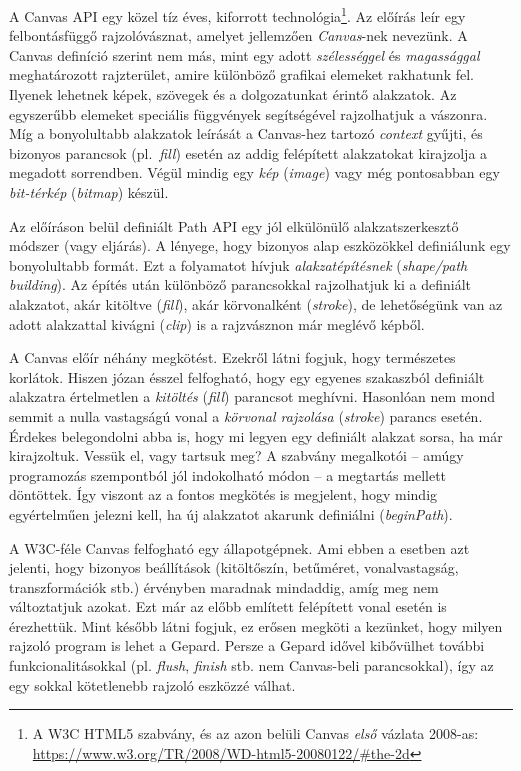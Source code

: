 \documentclass[12pt]{report}
\theoremstyle{definition}
\newcommand{\inenglish}[1]{\textsl{#1}}
\newcommand{\func}[1]{{\textsl{#1}}}
\begin{document}
A Canvas API egy közel tíz éves, kiforrott technológia\footnote {A W3C HTML5
szabvány, és az azon belüli Canvas \emph{első} vázlata 2008-as:\\
{\footnotesize\url{https://www.w3.org/TR/2008/WD-html5-20080122/\#the-2d}}}. Az
előírás leír egy felbontásfüggő rajzolóvásznat, amelyet jellemzően
\emph{Canvas}-nek nevezünk. A Canvas definíció szerint nem más, mint egy adott
\emph{szélességgel} és \emph{magassággal} meghatározott rajzterület, amire
különböző grafikai elemeket rakhatunk fel. Ilyenek lehetnek képek, szövegek és
a dolgozatunkat érintő alakzatok. Az egyszerűbb elemeket speciális függvények
segítségével rajzolhatjuk a vászonra. Míg a bonyolultabb alakzatok leírását a
Canvas-hez tartozó \emph{context} gyűjti, és bizonyos parancsok
(pl.~\emph{fill}) esetén az addig felépített alakzatokat kirajzolja a megadott
sorrendben. Végül mindig egy \emph{kép} (\inenglish{image}) vagy még
pontosabban egy \emph{bit-térkép} (\inenglish{bitmap}) készül.

Az előíráson belül definiált Path API egy jól elkülönülő alakzatszerkesztő
módszer (vagy eljárás). A lényege, hogy bizonyos alap eszközökkel definiálunk egy
bonyolultabb formát. Ezt a folyamatot hívjuk \emph{alakzatépítésnek}
(\inenglish{shape/path building}). Az építés után különböző parancsokkal
rajzolhatjuk ki a definiált alakzatot, akár kitöltve (\emph{fill}), akár
körvonalként (\emph{stroke}), de lehetőségünk van az adott alakzattal kivágni
(\emph{clip}) is a rajzvásznon már meglévő képből.

A Canvas előír néhány megkötést. Ezekről látni fogjuk, hogy természetes
korlátok. Hiszen józan ésszel felfogható, hogy egy egyenes szakaszból definiált
alakzatra értelmetlen a \emph{kitöltés} (\func{fill}) parancsot meghívni.
Hasonlóan nem mond semmit a nulla vastagságú vonal a \emph{körvonal rajzolása}
(\func{stroke}) parancs esetén. Érdekes belegondolni abba is, hogy mi legyen
egy definiált alakzat sorsa, ha már kirajzoltuk. Vessük el, vagy tartsuk meg? A
szabvány megalkotói -- amúgy programozás szempontból jól indokolható módon --
a megtartás mellett döntöttek. Így viszont az a fontos megkötés is megjelent,
hogy mindig egyértelműen jelezni kell, ha új alakzatot akarunk definiálni
(\func{beginPath}).

A W3C-féle Canvas felfogható egy állapotgépnek. Ami ebben a esetben azt
jelenti, hogy bizonyos beállítások (kitöltőszín, betűméret, vonalvastagság,
transzformációk stb.) érvényben maradnak mindaddig, amíg meg nem változtatjuk
azokat. Ezt már az előbb említett felépített vonal esetén is érezhettük. Mint
később látni fogjuk, ez erősen megköti a kezünket, hogy milyen rajzoló program
is lehet a Gepard. Persze a Gepard idővel kibővülhet további
funkcionalitásokkal (pl. \emph{flush}, \emph{finish} stb. nem Canvas-beli
parancsokkal), így az egy sokkal kötetlenebb rajzoló eszközzé válhat.
\end{document}
